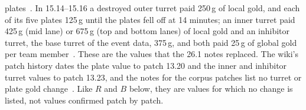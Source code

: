 \begin{itemize}
  plates~\cite{riot2026patch261}.
  In 15.14--15.16 a destroyed outer turret paid 250\,g of local gold, and each of its five plates
  125\,g until the plates fell off at 14 minutes; an inner turret paid 425\,g (mid lane) or 675\,g
  (top and bottom lanes) of local gold and an inhibitor turret, the base turret of the event data,
  375\,g, and both paid 25\,g of global gold per team member~\cite{riot2026patch261,lolwiki2026turret}.
  These are the values that the 26.1 notes replaced. The wiki's patch history dates the plate value
  to patch 13.20 and the inner and inhibitor turret values to patch 13.23, and the notes for the
  corpus patches list no turret or plate gold
  change~\cite{riot2025patch2514,riot2025patch2515,riot2025patch2516}. Like $R$ and $B$ below, they
  are values for which no change is listed, not values confirmed patch by patch.

\end{itemize}
